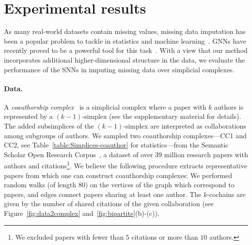 \section{Experimental results}

As many real-world datasets contain missing values, missing data imputation has been a popular problem to tackle in statistics and machine learning~\cite{little1986statistical, nelwamondo2007missing}.
GNNs have recently proved to be a powerful tool for this task~\cite{spinelli2020neural}.
With a view that our method incorporates additional higher-dimensional structure in the data, we evaluate the performance of the SNNs in imputing missing data over simplicial complexes.

\paragraph{Data.}
A \emph{coauthorship complex}~\cite{patania2017} is a simplicial complex where a paper with $k$ authors is represented by a $(k-1)$-simplex (see the supplementary material for details).
The added subsimplices of the $(k-1)$-simplex are interpreted as collaborations among subgroups of authors.
We sampled two coauthorship complexes---CC1 and CC2, see Table~\ref{table:Simplices-coauthor} for statistics---from the Semantic Scholar Open Research Corpus~\cite{ammar18NAACL}, a dataset of over $39$ million research papers with authors and citations\footnote{We excluded papers with fewer than $5$ citations or more than $10$ authors.}.
We believe the following procedure extracts representative papers from which one can construct coauthorship complexes: We performed random walks (of length $80$) on the vertices of the graph which correspond to papers, and edges connect papers sharing at least one author. The $k$-cochains are given by the number of shared citations of the given collaboration (see Figure~\ref{fig:data2complex} and~\ref{fig:bipartite}(b)-(c)).
